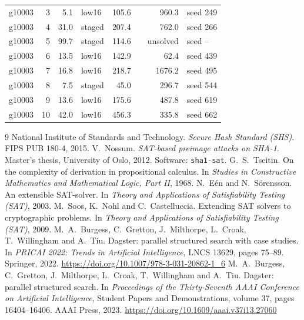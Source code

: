 \documentclass[11pt,a4paper]{article}
\begin{document}
{\begin{longtable}{@{}rrrlrlrl@{}}
g10003 & 3 & 5.1 & low16 & 105.6 & & 960.3 & seed 249\\
g10003 & 4 & 31.0 & staged & 207.4 & & 762.0 & seed 266\\
g10003 & 5 & 99.7 & staged & 114.6 & & unsolved & seed --\\
g10003 & 6 & 13.5 & low16 & 142.9 & & 62.4 & seed 439\\
g10003 & 7 & 16.8 & low16 & 218.7 & & 1676.2 & seed 495\\
g10003 & 8 & 7.5 & staged & 45.0 & & 296.7 & seed 544\\
g10003 & 9 & 13.6 & low16 & 175.6 & & 487.8 & seed 619\\
g10003 & 10 & 42.0 & low16 & 456.3 & & 335.8 & seed 662\\
\bottomrule\end{longtable}}


\begin{thebibliography}{9}
 National Institute of Standards and Technology. \emph{Secure Hash Standard (SHS)}. FIPS PUB 180-4, 2015.
 V.~Nossum. \emph{SAT-based preimage attacks on SHA-1}. Master's thesis, University of Oslo, 2012. Software: \texttt{sha1-sat}.
 G.~S.~Tseitin. On the complexity of derivation in propositional calculus. In \emph{Studies in Constructive Mathematics and Mathematical Logic, Part II}, 1968.
 N.~E{\'e}n and N.~S{\"o}rensson. An extensible SAT-solver. In \emph{Theory and Applications of Satisfiability Testing (SAT)}, 2003.
 M.~Soos, K.~Nohl and C.~Castelluccia. Extending SAT solvers to cryptographic problems. In \emph{Theory and Applications of Satisfiability Testing (SAT)}, 2009.
 M.~A.~Burgess, C.~Gretton, J.~Milthorpe, L.~Croak, T.~Willingham and A.~Tiu. Dagster: parallel structured search with case studies. In \emph{PRICAI 2022: Trends in Artificial Intelligence}, LNCS 13629, pages 75--89. Springer, 2022. \url{https://doi.org/10.1007/978-3-031-20862-1_6}
 M.~A.~Burgess, C.~Gretton, J.~Milthorpe, L.~Croak, T.~Willingham and A.~Tiu. Dagster: parallel structured search. In \emph{Proceedings of the Thirty-Seventh AAAI Conference on Artificial Intelligence}, Student Papers and Demonstrations, volume 37, pages 16404--16406. AAAI Press, 2023. \url{https://doi.org/10.1609/aaai.v37i13.27060}
\end{thebibliography}
\end{document}
